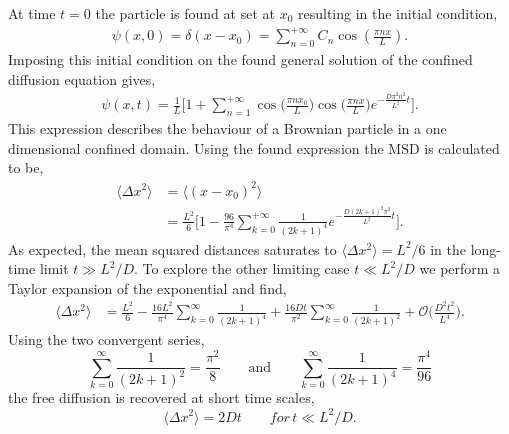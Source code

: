 At time $t=0$ the particle is found at set at $x_0$ resulting in the initial condition,
\begin{align}
  \psi(x, 0) = \delta(x-x_0) = \sum_{n=0}^{+ \infty} C_n \cos(\frac{\pi n x}{L}).
\end{align}
Imposing this initial condition on the found general solution of the confined diffusion
equation gives,
\begin{align}
  \psi(x, t)=\frac{1}{L} \Bigg[ 1 + \sum_{n=1}^{+\infty} \cos\Big(\frac{\pi n
  x_0}{L}\Big) \cos\Big(\frac{\pi n x}{L}\Big) e^{- \frac{D\pi^2  n^2}{L^2}t}\Bigg].
\end{align}
This expression describes the behaviour of a Brownian particle in a one dimensional
confined domain. Using the found expression the MSD is calculated to be,
\begin{align}
  \langle \Delta x^2 \rangle &= \langle(x-x_0)^2\rangle\\&= \frac{L^2}{6}\Bigg[1 -
  \frac{96}{\pi^4}
  \sum_{k=0}^{+\infty} \frac{1}{(2k+1)^4} e^{- \frac{D(2k+1)^2 \pi^2}{L^2}t}\Bigg].
\end{align}
As expected, the mean squared distances saturates to $\langle \Delta x^2 \rangle = L^2/6$
in the long-time limit $t \gg L^2 / D.$ To explore the other limiting case $t \ll L^2/D
$ we perform a Taylor expansion of the exponential and find,
\begin{align}
  \langle \Delta x^2 \rangle &= \frac{L^2}{6} - \frac{16 L^2}{\pi^4} \sum_{k=0}^{\infty}
  \frac{1}{(2k+1)^4} + \frac{16 D t}{\pi^2} \sum_{k=0}^{\infty} \frac{1}{(2k+1)^2} +
  \mathcal{O}\bigg(\frac{D^2 t^2}{L^4}\bigg).
\end{align}
Using the two convergent series,
\begin{equation}
  \sum_{k=0}^{\infty} \frac{1}{(2k+1)^2} = \frac{\pi^2}{8} \qquad \text{and} \qquad
  \sum_{k=0}^{\infty} \frac{1}{(2k+1)^4} = \frac{\pi^4}{96}
\end{equation}
the free diffusion is recovered at short time scales, \cite{BICKEL200724}
\begin{equation}
\langle \Delta x^2 \rangle = 2Dt \qquad for\, t \ll L^2/D.
\end{equation}
